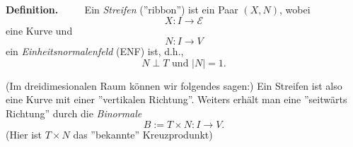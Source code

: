 \documentclass[a4paper,oneside,11pt,DIV=12,parskip=half]{scrartcl}
\newcommand{\E}{\mathcal E}
\newenvironment{definition}{\textbf{Definition.} ~~~~}{}
\newenvironment{lemma, definition}{\textbf{Lemma und Definition.} ~~~~}{}
\newenvironment{note, example}{\textbf{Bemerkung und Beispiel.} ~~~~}{}
\newenvironment{note, definition}{\textbf{Bemerkung und Definition.} ~~~~}{}
\begin{document}
\begin{definition}
	Ein \textit{Streifen} (''ribbon'') ist ein Paar $(X,N)$, wobei $$X:I \rightarrow \E$$ eine Kurve und $$ N: I \rightarrow V $$ ein \textit{Einheitsnormalenfeld} (ENF) ist, d.h.,
	\[N\perp T \text{ und } |N|=1. \]
\end{definition}

\begin{note, definition}
	(Im dreidimesionalen Raum können wir folgendes sagen:)
	Ein Streifen ist also eine Kurve mit einer ''vertikalen Richtung''.
	Weiters erhält man eine ''seitwärts Richtung'' durch die \textit{Binormale} $$B:=T\times N : I\rightarrow V.$$ (Hier ist $T \times N$ das ''bekannte'' Kreuzprodunkt)
	
\end{note, definition}
\end{document}
